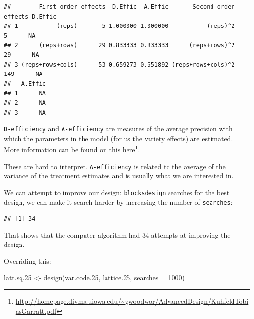\documentclass[
]{book}
\newenvironment{Shaded}{\begin{snugshade}}{\end{snugshade}}
\newcommand{\AttributeTok}[1]{\textcolor[rgb]{0.77,0.63,0.00}{#1}}
\newcommand{\CommentTok}[1]{\textcolor[rgb]{0.56,0.35,0.01}{\textit{#1}}}
\newcommand{\DecValTok}[1]{\textcolor[rgb]{0.00,0.00,0.81}{#1}}
\newcommand{\FloatTok}[1]{\textcolor[rgb]{0.00,0.00,0.81}{#1}}
\newcommand{\FunctionTok}[1]{\textcolor[rgb]{0.00,0.00,0.00}{#1}}
\newcommand{\NormalTok}[1]{#1}
\newcommand{\OtherTok}[1]{\textcolor[rgb]{0.56,0.35,0.01}{#1}}
\newcommand{\SpecialCharTok}[1]{\textcolor[rgb]{0.00,0.00,0.00}{#1}}
\renewcommand{\href}[2]{#2\footnote{\url{#1}}}
\begin{document}
\begin{Shaded}
\end{Shaded}

\begin{verbatim}
##        First_order effects  D.Effic  A.Effic       Second_order effects D.Effic
## 1           (reps)       5 1.000000 1.000000           (reps)^2       5      NA
## 2      (reps+rows)      29 0.833333 0.833333      (reps+rows)^2      29      NA
## 3 (reps+rows+cols)      53 0.659273 0.651892 (reps+rows+cols)^2     149      NA
##   A.Effic
## 1      NA
## 2      NA
## 3      NA
\end{verbatim}

\texttt{D-efficiency} and \texttt{A-efficiency} are measures of the average precision with which the parameters in the model (for us the variety effects) are estimated. More information can be found on this \href{http://homepage.divms.uiowa.edu/~gwoodwor/AdvancedDesign/KuhfeldTobiasGarratt.pdf}{here}.

These are hard to interpret. \texttt{A-efficiency} is related to the average of the variance of the treatment estimates and is usually what we are interested in.

We can attempt to improve our design: \texttt{blocksdesign} searches for the best design, we can make it search harder by increasing the number of \texttt{searches}:

\begin{Shaded}
\end{Shaded}

\begin{verbatim}
## [1] 34
\end{verbatim}

That shows that the computer algorithm had 34 attempts at improving the design.

Overriding this:

\begin{Shaded}
\begin{Highlighting}[]
\NormalTok{latt.sq}\FloatTok{.25} \OtherTok{\textless{}{-}} \FunctionTok{design}\NormalTok{(var.code}\FloatTok{.25}\NormalTok{, lattice}\FloatTok{.25}\NormalTok{, }\AttributeTok{searches =} \DecValTok{1000}\NormalTok{)}
\end{Highlighting}
\end{Shaded}
\end{document}
